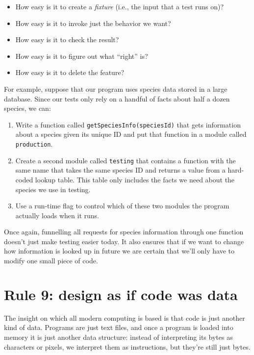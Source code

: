 \documentclass[10pt,letterpaper]{article}
\begin{document}
\begin{itemize}
\item
  How easy is it to create a \emph{fixture}
  (i.e., the input that a test runs on)?
\item
  How easy is it to invoke just the behavior we want?
\item
  How easy is it to check the result?
\item
  How easy is it to figure out what ``right'' is?
\item
  How easy is it to delete the feature?
\end{itemize}

For example,
suppose that our program uses species data stored in a large database.
Since our tests only rely on a handful of facts about half a dozen species,
we can:

\begin{enumerate}
\item
  Write a function called \texttt{getSpeciesInfo(speciesId)}
  that gets information about a species given its unique ID
  and put that function in a module called \texttt{production}.
\item
  Create a second module called \texttt{testing}
  that contains a function with the same name
  that takes the same species ID
  and returns a value from a hard-coded lookup table.
  This table only includes the facts we need about the species we use in testing.
\item
  Use a run-time flag to control which of these two modules the program actually loads
  when it runs.
\end{enumerate}

Once again,
funnelling all requests for species information through one function
doesn't just make testing easier today.
It also ensures that if we want to change how information is looked up in future
we are certain that we'll only have to modify one small piece of code.

\section*{Rule 9: design as if code was data}

The insight on which all modern computing is based is that
code is just another kind of data.
Programs are just text files,
and once a program is loaded into memory it is just another data structure:
instead of interpreting its bytes as characters or pixels,
we interpret them as instructions,
but they're still just bytes.
\end{document}
